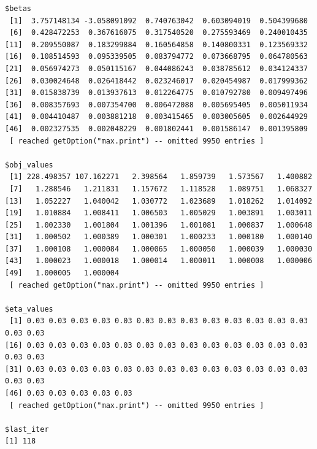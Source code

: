 \documentclass[
  letterpaper,
  DIV=11,
  numbers=noendperiod]{scrartcl}
\newenvironment{Shaded}{\begin{snugshade}}{\end{snugshade}}
\newcommand{\DecValTok}[1]{\textcolor[rgb]{0.68,0.00,0.00}{#1}}
\newcommand{\FunctionTok}[1]{\textcolor[rgb]{0.28,0.35,0.67}{#1}}
\newcommand{\NormalTok}[1]{\textcolor[rgb]{0.00,0.23,0.31}{#1}}
\newcommand{\SpecialCharTok}[1]{\textcolor[rgb]{0.37,0.37,0.37}{#1}}
\newcommand{\StringTok}[1]{\textcolor[rgb]{0.13,0.47,0.30}{#1}}
\begin{document}
\begin{verbatim}
$betas
 [1]  3.757148134 -3.058091092  0.740763042  0.603094019  0.504399680
 [6]  0.428472253  0.367616075  0.317540520  0.275593469  0.240010435
[11]  0.209550087  0.183299884  0.160564858  0.140800331  0.123569332
[16]  0.108514593  0.095339505  0.083794772  0.073668795  0.064780563
[21]  0.056974273  0.050115167  0.044086243  0.038785612  0.034124337
[26]  0.030024648  0.026418442  0.023246017  0.020454987  0.017999362
[31]  0.015838739  0.013937613  0.012264775  0.010792780  0.009497496
[36]  0.008357693  0.007354700  0.006472088  0.005695405  0.005011934
[41]  0.004410487  0.003881218  0.003415465  0.003005605  0.002644929
[46]  0.002327535  0.002048229  0.001802441  0.001586147  0.001395809
 [ reached getOption("max.print") -- omitted 9950 entries ]

$obj_values
 [1] 228.498357 107.162271   2.398564   1.859739   1.573567   1.400882
 [7]   1.288546   1.211831   1.157672   1.118528   1.089751   1.068327
[13]   1.052227   1.040042   1.030772   1.023689   1.018262   1.014092
[19]   1.010884   1.008411   1.006503   1.005029   1.003891   1.003011
[25]   1.002330   1.001804   1.001396   1.001081   1.000837   1.000648
[31]   1.000502   1.000389   1.000301   1.000233   1.000180   1.000140
[37]   1.000108   1.000084   1.000065   1.000050   1.000039   1.000030
[43]   1.000023   1.000018   1.000014   1.000011   1.000008   1.000006
[49]   1.000005   1.000004
 [ reached getOption("max.print") -- omitted 9950 entries ]

$eta_values
 [1] 0.03 0.03 0.03 0.03 0.03 0.03 0.03 0.03 0.03 0.03 0.03 0.03 0.03 0.03 0.03
[16] 0.03 0.03 0.03 0.03 0.03 0.03 0.03 0.03 0.03 0.03 0.03 0.03 0.03 0.03 0.03
[31] 0.03 0.03 0.03 0.03 0.03 0.03 0.03 0.03 0.03 0.03 0.03 0.03 0.03 0.03 0.03
[46] 0.03 0.03 0.03 0.03 0.03
 [ reached getOption("max.print") -- omitted 9950 entries ]

$last_iter
[1] 118
\end{verbatim}

\begin{Shaded}
\end{Shaded}
\end{document}

